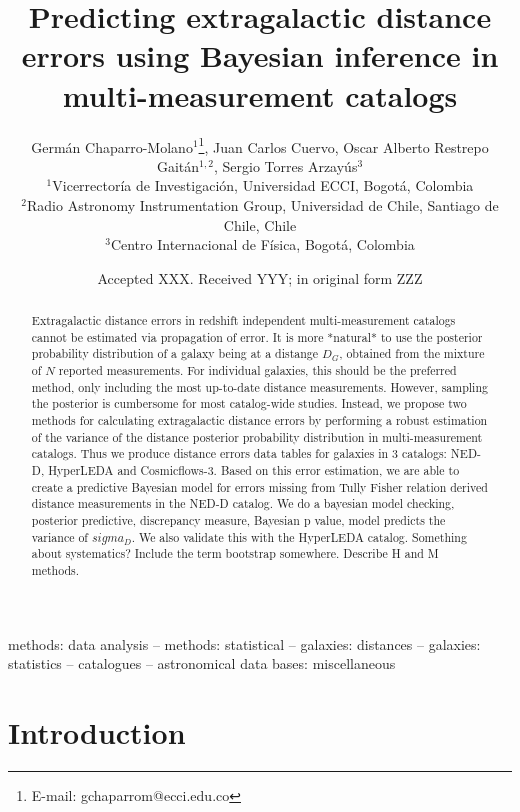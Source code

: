 \documentclass[a4paper,fleqn,usenatbib]{mnras}
\title[Predicting extragalactic distance errors]{Predicting extragalactic distance errors using Bayesian inference in multi-measurement catalogs}
\author[G. Chaparro-Molano et al.]{Germ\'an Chaparro-Molano$^{1}$\thanks{E-mail: gchaparrom@ecci.edu.co},
Juan Carlos Cuervo,
Oscar Alberto Restrepo Gait\'an$^{1,2}$, \newauthor
Sergio Torres Arzay\'{u}s$^{3}$
\\
$^{1}$Vicerrector\'ia de Investigaci\'on, Universidad ECCI, Bogot\'a, Colombia\\
$^{2}$Radio Astronomy Instrumentation Group, Universidad de Chile, Santiago de Chile, Chile\\
$^{3}$Centro Internacional de F\'isica, Bogot\'a, Colombia
}
\date{Accepted XXX. Received YYY; in original form ZZZ}
\begin{document}
\label{firstpage}
\pagerange{\pageref{firstpage}--\pageref{lastpage}}
\maketitle

\begin{abstract}
Extragalactic distance errors in redshift independent multi-measurement catalogs cannot be estimated via propagation of error. It is more *natural* to use the posterior probability distribution of a galaxy being at a distange $D_G$, obtained from the mixture of $N$ reported measurements. For individual galaxies, this should be the preferred method, only including the most up-to-date distance measurements. However, sampling the posterior is cumbersome for most catalog-wide studies. Instead, we propose two methods for calculating extragalactic distance errors by performing a robust estimation of the variance of the distance posterior probability distribution in multi-measurement catalogs. Thus we produce distance errors data tables for galaxies in 3 catalogs: NED-D, HyperLEDA and Cosmicflows-3. Based on this error estimation, we are able to create a predictive Bayesian model for errors missing from Tully Fisher relation derived distance measurements in the NED-D catalog. We do a bayesian model checking, posterior predictive, discrepancy measure, Bayesian p value, model predicts the variance of $sigma_D$. We also validate this with the HyperLEDA catalog. Something about systematics? Include the term bootstrap somewhere. Describe H and M methods.
\end{abstract}

\begin{keywords}
methods: data analysis -- methods: statistical -- galaxies: distances -- galaxies: statistics -- catalogues -- astronomical data bases: miscellaneous
\end{keywords}



\section{Introduction}
\end{document}
